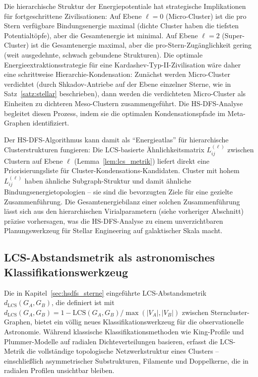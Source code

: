 ﻿\documentclass[a4paper,12pt]{report}
\theoremstyle{definition}
\begin{document}
Die hierarchische Struktur der Energiepotentiale hat strategische Implikationen für fortgeschrittene Zivilisationen: Auf Ebene $\ell = 0$ (Micro-Cluster) ist die pro Stern verfügbare Bindungsenergie maximal (dichte Cluster haben die tiefsten Potentialtöpfe), aber die Gesamtenergie ist minimal. Auf Ebene $\ell = 2$ (Super-Cluster) ist die Gesamtenergie maximal, aber die pro-Stern-Zugänglichkeit gering (weit ausgedehnte, schwach gebundene Strukturen). Die optimale Energieextraktionsstrategie für eine Kardashev-Typ-II-Zivilisation wäre daher eine schrittweise Hierarchie-Kondensation: Zunächst werden Micro-Cluster verdichtet (durch Shkadov-Antriebe auf der Ebene einzelner Sterne, wie in Satz~\ref{satz:stellar} beschrieben), dann werden die verdichteten Micro-Cluster als Einheiten zu dichteren Meso-Clustern zusammengeführt. Die HS-DFS-Analyse begleitet diesen Prozess, indem sie die optimalen Kondensationspfade im Meta-Graphen identifiziert.

Der HS-DFS-Algorithmus kann damit als ``Energieatlas'' für hierarchische Clusterstrukturen fungieren: Die LCS-basierte Ähnlichkeitsmatrix $L^{(\ell)}_{ij}$ zwischen Clustern auf Ebene $\ell$ (Lemma~\ref{lem:lcs_metrik}) liefert direkt eine Priorisierungsliste für Cluster-Kondensations-Kandidaten. Cluster mit hohem $L^{(\ell)}_{ij}$ haben ähnliche Subgraph-Struktur und damit ähnliche Bindungsenergietopologien -- sie sind die bevorzugten Ziele für eine gezielte Zusammenführung. Die Gesamtenergiebilanz einer solchen Zusammenführung lässt sich aus den hierarchischen Virialparametern (siehe vorheriger Abschnitt) präzise vorhersagen, was die HS-DFS-Analyse zu einem unverzichtbaren Planungswerkzeug für Stellar Engineering auf galaktischer Skala macht.

\subsection{LCS-Abstandsmetrik als astronomisches Klassifikationswerkzeug}

Die in Kapitel~\ref{sec:hsdfs_sterne} eingeführte LCS-Abstandsmetrik $d_\mathrm{LCS}(G_A, G_B)$, die definiert ist mit $d_\mathrm{LCS}(G_A, G_B) = 1 - \mathrm{LCS}(G_A, G_B) / \max(|V_A|, |V_B|)$ zwischen Sterncluster-Graphen, bietet ein völlig neues Klassifikationswerkzeug für die observationelle Astronomie. Während klassische Klassifikationsmethoden wie King-Profile \cite{king1966} und Plummer-Modelle \cite{plummer1911} auf radialen Dichteverteilungen basieren, erfasst die LCS-Metrik die vollständige topologische Netzwerkstruktur eines Clusters -- einschließlich asymmetrischer Substrukturen, Filamente und Doppelkerne, die in radialen Profilen unsichtbar bleiben.
\end{document}

